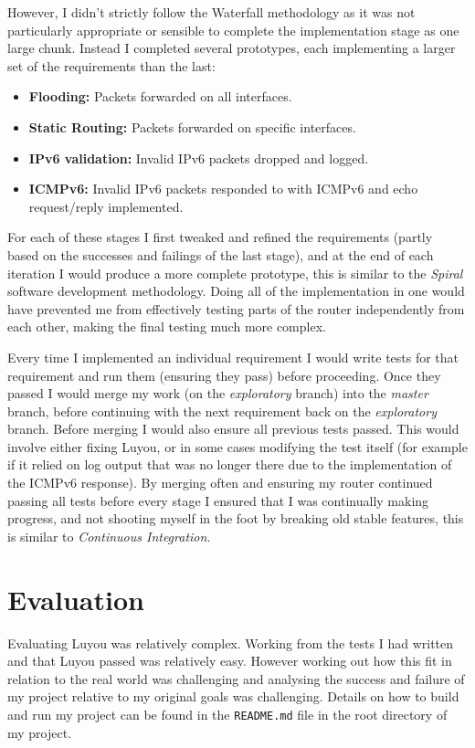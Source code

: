\documentclass[12pt,a4paper,twoside,openright]{report}
\begin{document}
\bigskip

However, I didn't strictly follow the Waterfall methodology as it was not particularly appropriate or sensible to complete the implementation stage as one large chunk.  Instead I completed several prototypes, each implementing a larger set of the requirements than the last:
\begin{itemize}
\item \textbf{Flooding:} Packets forwarded on all interfaces.
\item \textbf{Static Routing:} Packets forwarded on specific interfaces.
\item \textbf{IPv6 validation:} Invalid IPv6 packets dropped and logged.
\item \textbf{ICMPv6:} Invalid IPv6 packets responded to with ICMPv6 and echo request/reply implemented.
\end{itemize}
For each of these stages I first tweaked and refined the requirements (partly based on the successes and failings of the last stage), and at the end of each iteration I would produce a more complete prototype, this is similar to the \textit{Spiral} software development methodology. Doing all of the implementation in one would have prevented me from effectively testing parts of the router independently from each other, making the final testing much more complex.

\bigskip

Every time I implemented an individual requirement I would write tests for that requirement and run them (ensuring they pass) before proceeding.  Once they passed I would merge my work (on the \textit{exploratory} branch) into the \textit{master} branch, before continuing with the next requirement back on the \textit{exploratory} branch.  Before merging I would also ensure all previous tests passed.  This would involve either fixing Luyou, or in some cases modifying the test itself (for example if it relied on log output that was no longer there due to the implementation of the ICMPv6 response).  By merging often and ensuring my router continued passing all tests before every stage I ensured that I was continually making progress, and not shooting myself in the foot by breaking old stable features, this is similar to \textit{Continuous Integration}.

\chapter{Evaluation}

Evaluating Luyou was relatively complex. Working from the tests I had written and that Luyou passed was relatively easy.  However working out how this fit in relation to the real world was challenging and analysing the success and failure of my project relative to my original goals was challenging. Details on how to build and run my project can be found in the \verb!README.md! file in the root directory of my project. 
\end{document}
